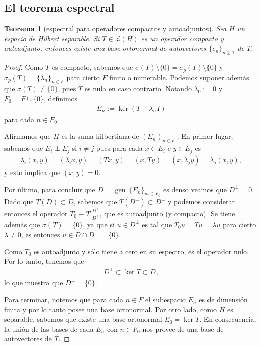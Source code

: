 \documentclass[11pt]{report}
\theoremstyle{colored}
\newtheorem{theorem}{Teorema}[section]
\newcommand{\ip}[1]{( #1 )}
\begin{document}
\subsection{El teorema espectral}
\begin{theorem}[espectral para operadores compactos y autoadjuntos] Sea $H$ un espacio de Hilbert separable. Si $T \in \mathscr{L}(H)$ es un operador compacto y autoadjunto, entonces existe una base ortonormal de autovectores $\{e_n\}_{n \geq 1}$ de $T$.
\end{theorem}
\begin{proof} Como $T$ es compacto, sabemos que $\sigma(T) \setminus \{0\} = \sigma_p(T) \setminus \{0\}$ y $\sigma_p(T) = \{\lambda_n\}_{n \in F}$ para cierto $F$ finito o numerable. Podemos suponer además que $\sigma(T) \neq \{0\}$, pues $T$ es nula en caso contrario. Notando $\lambda_0 := 0$ y $F_0 = F \cup \{0\}$, definimos
\begin{align*}
E_n := \ker (T - \lambda_nI)
\end{align*} 
para cada $n \in F_0$. 

Afirmamos que $H$ es la suma hilbertiana de $(E_n)_{n \in F_0}$. En primer lugar, sabemos que $E_i \perp E_j$ si $i \neq j$ pues para cada $x \in E_i$ e $y \in E_j$ es
\begin{align*}
\lambda_i(x,y) = (\lambda_ix,y) = (Tx,y) = (x,Ty) = (x,\lambda_jy) = \lambda_j(x,y),
\end{align*}
y esto implica que $\ip{x,y} = 0$. 

Por último, para concluir que $D = \operatorname{gen} \ \{E_n\}_{m \in F_0}$ es denso veamos que $D^\perp = 0$. Dado que $T(D) \subset D$, sabemos que $T(D^\perp) \subset D^\perp$ y podemos considerar entonces el operador $T_0 \equiv T|_{D^\perp}^{D^\perp}$, que es autoadjunto (y compacto). Se tiene además que $\sigma(T) = \{0\}$, ya que si $u \in D^\perp$ es tal que $T_0u = Tu = \lambda u$ para cierto $\lambda \neq 0$, es entonces $u \in D \cap D^\perp = \{0\}$.

Como $T_0$ es autoadjunto y sólo tiene a cero en su espectro, es el operador nulo. Por lo tanto, tenemos que
\begin{align*}
D^\perp \subset \ker T \subset D,
\end{align*}
lo que muestra que $D^\perp = \{0\}$.

Para terminar, notemos que para cada $n \in F$ el subespacio $E_n$ es de dimensión finita y por lo tanto posee una base ortonormal. Por otro lado, como $H$ es separable, sabemos que existe una base ortonormal $E_0 = \ker T$. En consecuencia, la unión de las bases de cada $E_n$ con $n \in F_0$ nos provee de una base de autovectores de $T$.
\end{proof}
\end{document}
